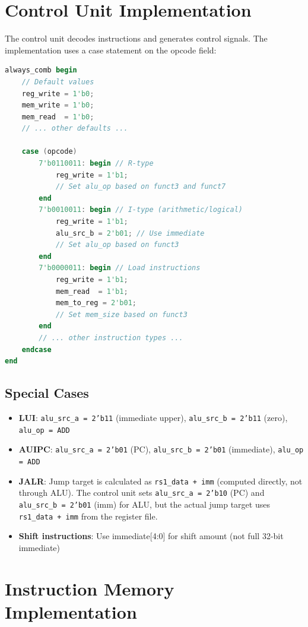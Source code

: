 \section{Control Unit Implementation}

The control unit decodes instructions and generates control signals. The implementation uses a case statement on the opcode field:

\begin{lstlisting}[language=Verilog, caption=Control Unit Structure]
always_comb begin
    // Default values
    reg_write = 1'b0;
    mem_write = 1'b0;
    mem_read  = 1'b0;
    // ... other defaults ...
    
    case (opcode)
        7'b0110011: begin // R-type
            reg_write = 1'b1;
            // Set alu_op based on funct3 and funct7
        end
        7'b0010011: begin // I-type (arithmetic/logical)
            reg_write = 1'b1;
            alu_src_b = 2'b01; // Use immediate
            // Set alu_op based on funct3
        end
        7'b0000011: begin // Load instructions
            reg_write = 1'b1;
            mem_read  = 1'b1;
            mem_to_reg = 2'b01;
            // Set mem_size based on funct3
        end
        // ... other instruction types ...
    endcase
end
\end{lstlisting}

\subsection{Special Cases}

\begin{itemize}
    \item \textbf{LUI}: \texttt{alu\_src\_a = 2'b11} (immediate upper), \texttt{alu\_src\_b = 2'b11} (zero), \texttt{alu\_op = ADD}
    \item \textbf{AUIPC}: \texttt{alu\_src\_a = 2'b01} (PC), \texttt{alu\_src\_b = 2'b01} (immediate), \texttt{alu\_op = ADD}
    \item \textbf{JALR}: Jump target is calculated as \texttt{rs1\_data + imm} (computed directly, not through ALU). The control unit sets \texttt{alu\_src\_a = 2'b10} (PC) and \texttt{alu\_src\_b = 2'b01} (imm) for ALU, but the actual jump target uses \texttt{rs1\_data + imm} from the register file.
    \item \textbf{Shift instructions}: Use immediate[4:0] for shift amount (not full 32-bit immediate)
\end{itemize}

\section{Instruction Memory Implementation}

